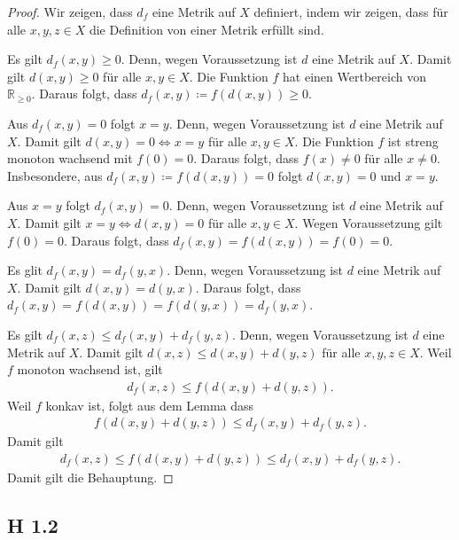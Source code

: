 \documentclass[draft,a5paper]{article}
\begin{document}
\begin{proof}
  Wir zeigen, dass \(d_{f}\) eine Metrik auf \(X\) definiert, indem
  wir zeigen, dass für alle \(x, y, z \in X\) die Definition von einer
  Metrik erfüllt sind.

  Es gilt \(d_{f}(x,y) \ge 0\).  Denn, wegen Voraussetzung ist \(d\)
  eine Metrik auf \(X\). Damit gilt \(d(x,y) \ge 0\) für alle \(x, y \in
  X\).  Die Funktion \(f\) hat einen Wertbereich von \(\mathbb{R}_{\ge 0}\).
  Daraus folgt, dass \(d_{f}(x, y) \coloneq f(d(x,y)) \ge 0\).

  Aus \(d_{f}(x, y) = 0\) folgt \(x = y\).  Denn, wegen Voraussetzung ist \(d\)
  eine Metrik auf \(X\). Damit gilt \(d(x,y) = 0 \iff  x = y\) für alle \(x, y \in
  X\).    Die Funktion \(f\) ist streng monoton wachsend mit \(f(0) = 0\).
  Daraus folgt, dass \(f(x) \ne 0 \) für alle \(x \ne 0\).  Insbesondere,
  aus \(d_{f}(x, y) \coloneq f(d(x, y)) = 0\) folgt \(d(x, y) = 0\) und \(x =
  y\).

  Aus \(x = y\) folgt \(d_{f}(x, y) = 0\). Denn, wegen Voraussetzung ist \(d\)
  eine Metrik auf \(X\). Damit gilt \(x = y \iff  d(x,y) = 0\) für alle \(x, y \in
  X\).    Wegen Voraussetzung gilt \(f(0)=0\).  Daraus folgt, dass
  \(d_{f}(x, y) = f(d(x, y)) = f(0) = 0\).

  Es glit \(d_{f}(x, y) = d_{f}(y, x)\). Denn, wegen Voraussetzung ist \(d\)
  eine Metrik auf \(X\). Damit gilt \(d(x, y) = d(y, x)\).  Daraus
  folgt, dass \(d_{f}(x, y) = f(d(x, y)) = f(d(y, x)) = d_{f}(y, x)\).

  Es gilt \(d_{f}(x, z) \le d_{f}(x, y) + d_{f}(y, z)\).  Denn, wegen
  Voraussetzung ist \(d\) eine Metrik auf \(X\). Damit gilt
  \(d(x, z) \le d(x, y) + d(y, z)\) für alle \(x, y, z \in X\).  Weil
  \(f\) monoton wachsend ist, gilt
  \begin{align*}
    d_{f}(x, z) \le f(d(x, y) + d(y, z)).
  \end{align*}
  Weil \(f\) konkav ist, folgt aus dem Lemma dass
  \begin{align*}
    f(d(x, y) + d(y, z)) \le d_{f}(x, y) + d_{f}(y, z).
  \end{align*}
  Damit gilt
  \begin{align*}
    d_{f}(x, z) \le f(d(x, y) + d(y, z)) \le d_{f}(x, y) + d_{f}(y, z).
  \end{align*}
  Damit gilt die Behauptung.
\end{proof}

\subsection*{H 1.2}
\end{document}
